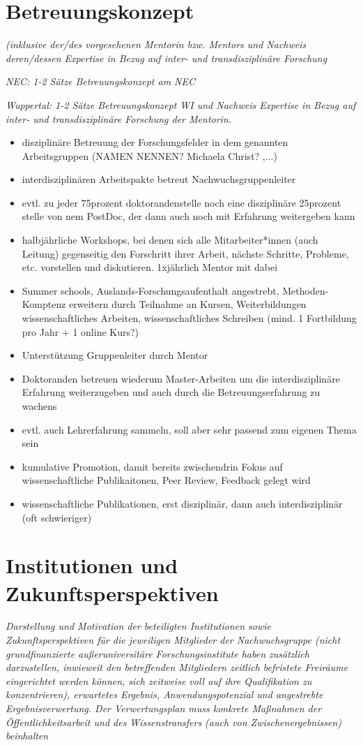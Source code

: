 \documentclass[a4paper,11pt,twoside]{scrartcl}
\begin{document}
\section{Betreuungskonzept}
\textit{(inklusive der/des vorgesehenen Mentorin bzw. Mentors und Nachweis deren/dessen Expertise in Bezug auf inter- und transdisziplinäre Forschung}

\textit{NEC: 1-2 Sätze Betreuungskonzept am NEC}

\textit{Wuppertal: 1-2 Sätze Betreuungskonzept WI und Nachweis Expertise in Bezug auf inter- und transdisziplinäre Forschung der Mentorin.}

\begin{itemize}
 \item disziplinäre Betreuung der Forschungsfelder in dem genannten Arbeitsgruppen (NAMEN NENNEN? Michaela Christ? ,...)
 \item interdisziplinären Arbeitspakte betreut Nachwuchsgruppenleiter
 \item evtl. zu jeder 75prozent doktorandenstelle noch eine disziplinäre 25prozent stelle von nem PostDoc, der dann auch noch mit Erfahrung weitergeben kann
 \item halbjährliche Workshops, bei denen sich alle Mitarbeiter*innen (auch Leitung) gegenseitig den Forschritt ihrer Arbeit, nächste Schritte, Probleme, etc. vorstellen und diskutieren. 1xjährlich Mentor mit dabei
 \item Summer schools, Auslands-Forschungsaufenthalt angestrebt, Methoden-Komptenz erweitern durch Teilnahme an Kursen, Weiterbildungen wissenschaftliches Arbeiten, wissenschaftliches Schreiben (mind. 1 Fortbildung pro Jahr + 1 online Kurs?)
 \item Unterstützung Gruppenleiter durch Mentor
 \item Doktoranden betreuen wiederum Master-Arbeiten um die interdisziplinäre Erfahrung weiterzugeben und auch durch die Betreuungserfahrung zu wachens
 \item evtl. auch Lehrerfahrung sammeln, soll aber sehr passend zum eigenen Thema sein
 \item kumulative Promotion, damit bereits zwischendrin Fokus auf wissenschaftliche Publikaitonen, Peer Review, Feedback gelegt wird
 \item wissenschaftliche Publikationen, erst disziplinär, dann auch interdisziplinär (oft schwieriger)
\end{itemize}

\section{Institutionen und Zukunftsperspektiven}
\textit{Darstellung und Motivation der beteiligten Institutionen sowie Zukunftsperspektiven für die jeweiligen Mitglieder der Nachwuchsgruppe (nicht grundfinanzierte außeruniversitäre Forschungsinstitute haben zusätzlich darzustellen, inwieweit den betreffenden Mitgliedern zeitlich befristete Freiräume eingerichtet werden können, sich zeitweise voll auf ihre Qualifikation zu konzentrieren), erwartetes Ergebnis, Anwendungspotenzial und angestrebte Ergebnisverwertung. Der Verwertungsplan muss konkrete Maßnahmen der Öffentlichkeitsarbeit und des Wissenstransfers (auch von Zwischenergebnissen) beinhalten}
\end{document}
